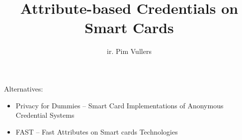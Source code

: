 \title{Attribute-based Credentials on Smart Cards}
\author{ir. Pim Vullers}

\maketitle

Alternatives:
\begin{itemize}
  \item Privacy for Dummies -- Smart Card Implementations of Anonymous 
Credential Systems
  \item FAST -- Fast Attributes on Smart cards Technologies
\end{itemize}
